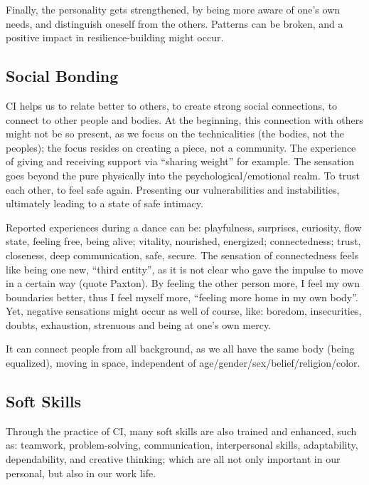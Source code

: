Finally, the personality gets strengthened, by being more aware of one's own needs, and distinguish oneself from the others.
Patterns can be broken, and a positive impact in resilience-building might occur.

\subsection{Social Bonding}\label{subsec:social-bonding}

CI helps us to relate better to others, to create strong social connections, to connect to other people and bodies.
At the beginning, this connection with others might not be so present, as we focus on the technicalities (the bodies, not the peoples); the focus resides on creating a piece, not a community.
The experience of giving and receiving support via ``sharing weight'' for example.
The sensation goes beyond the pure physically into the psychological/emotional realm.
To trust each other, to feel safe again.
Presenting our vulnerabilities and instabilities, ultimately leading to a state of safe intimacy.

Reported experiences during a dance can be: playfulness, surprises, curiosity, flow state, feeling free, being alive; vitality, nourished, energized; connectedness; trust, closeness, deep communication, safe, secure.
The sensation of connectedness feels like being one new, ``third entity'', as it is not clear who gave the impulse to move in a certain way (quote Paxton).
By feeling the other person more, I feel my own boundaries better, thus I feel myself more, ``feeling more home in my own body''.
Yet, negative sensations might occur as well of course, like: boredom, insecurities, doubts, exhaustion, strenuous and being at one's own mercy.

It can connect people from all background, as we all have the same body (being equalized), moving in space, independent of age/gender/sex/belief/religion/color.

\subsection{Soft Skills}\label{subsec:soft-skills}

Through the practice of CI, many soft skills are also trained and enhanced, such as: teamwork, problem-solving, communication, interpersonal skills, adaptability, dependability, and creative thinking; which are all not only important in our personal, but also in our work life.


